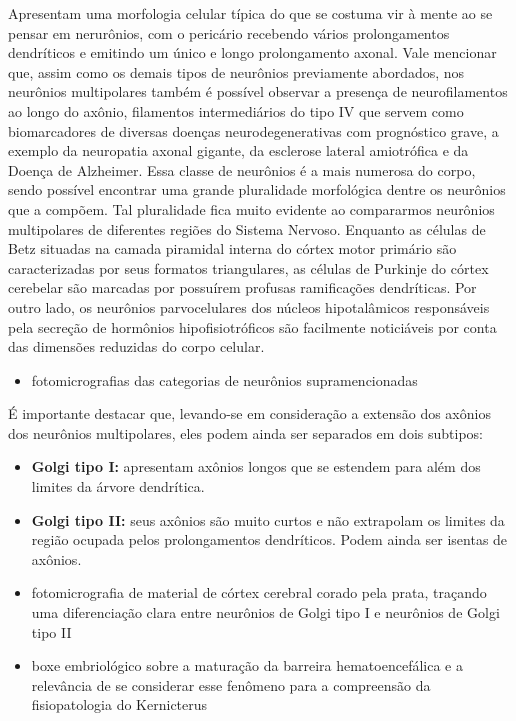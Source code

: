\documentclass[
]{book}
\providecommand{\tightlist}{%
  \setlength{\itemsep}{0pt}\setlength{\parskip}{0pt}}
\theoremstyle{definition}
\theoremstyle{definition}
\theoremstyle{definition}
\theoremstyle{definition}
\theoremstyle{remark}
\begin{document}
Apresentam uma morfologia celular típica do que se costuma vir à mente ao se pensar em nerurônios, com o pericário recebendo vários prolongamentos dendríticos e emitindo um único e longo prolongamento axonal. Vale mencionar que, assim como os demais tipos de neurônios previamente abordados, nos neurônios multipolares também é possível observar a presença de neurofilamentos ao longo do axônio, filamentos intermediários do tipo IV que servem como biomarcadores de diversas doenças neurodegenerativas com prognóstico grave, a exemplo da neuropatia axonal gigante, da esclerose lateral amiotrófica e da Doença de Alzheimer. Essa classe de neurônios é a mais numerosa do corpo, sendo possível encontrar uma grande pluralidade morfológica dentre os neurônios que a compõem. Tal pluralidade fica muito evidente ao compararmos neurônios multipolares de diferentes regiões do Sistema Nervoso. Enquanto as células de Betz situadas na camada piramidal interna do córtex motor primário são caracterizadas por seus formatos triangulares, as células de Purkinje do córtex cerebelar são marcadas por possuírem profusas ramificações dendríticas. Por outro lado, os neurônios parvocelulares dos núcleos hipotalâmicos responsáveis pela secreção de hormônios hipofisiotróficos são facilmente noticiáveis por conta das dimensões reduzidas do corpo celular.

\begin{itemize}
\tightlist
\item
  fotomicrografias das categorias de neurônios supramencionadas
\end{itemize}

É importante destacar que, levando-se em consideração a extensão dos axônios dos neurônios multipolares, eles podem ainda ser separados em dois subtipos:

\begin{itemize}
\item
  \textbf{Golgi tipo I:} apresentam axônios longos que se estendem para além dos limites da árvore dendrítica.
\item
  \textbf{Golgi tipo II:} seus axônios são muito curtos e não extrapolam os limites da região ocupada pelos prolongamentos dendríticos. Podem ainda ser isentas de axônios.
\item
  fotomicrografia de material de córtex cerebral corado pela prata, traçando uma diferenciação clara entre neurônios de Golgi tipo I e neurônios de Golgi tipo II
\item
  boxe embriológico sobre a maturação da barreira hematoencefálica e a relevância de se considerar esse fenômeno para a compreensão da fisiopatologia do Kernicterus
\end{itemize}
\end{document}
